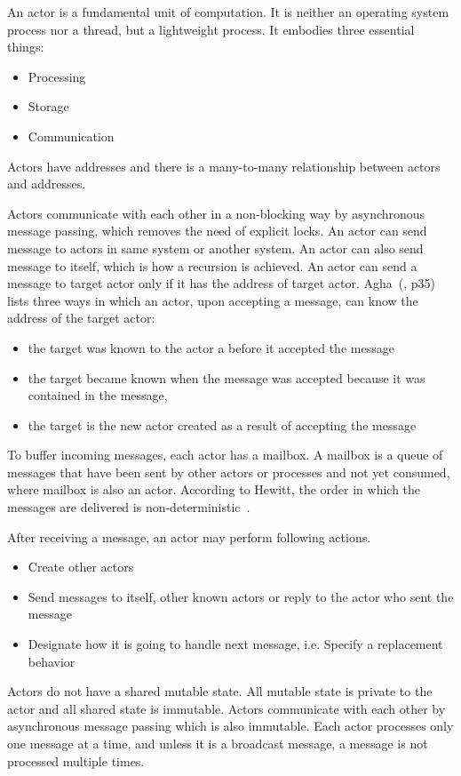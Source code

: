   An actor is a fundamental unit of computation. It is neither an operating system process nor a thread, but a lightweight process. It embodies three essential things:
\begin{itemize}
  \item Processing
  \item Storage
  \item Communication
\end{itemize}
  Actors have addresses and there is a many-to-many relationship between actors and addresses.

  Actors communicate with each other in a non-blocking way by asynchronous message passing, which removes the need of explicit locks. An actor can send message to actors in same system or another system. An actor can also send message to itself, which is how a recursion is achieved. An actor can send a message to target actor only if it has the address of target actor. Agha~(\cite{agha}, p35) lists three ways in which an actor, upon accepting a message, can know the address of the target actor:
  \begin{itemize}
    \item the target was known to the actor a before it accepted the message
    \item the target became known when the message was accepted because it was contained in the message,
    \item the target is the new actor created as a result of accepting the message
  \end{itemize}

  To buffer incoming messages, each actor has a mailbox. A mailbox is a queue of messages that have been sent by other actors or processes and not yet consumed, where mailbox is also an actor. According to Hewitt, the order in which the messages are delivered is non-deterministic~\cite{hewittVideo}.

After receiving a message, an actor may perform following actions.~\cite{hewitt}
\begin{itemize}
  \item Create other actors
  \item Send messages to itself, other known actors or reply to the actor who sent the message
  \item Designate how it is going to handle next message, i.e. Specify a replacement behavior
\end{itemize}

  Actors do not have a shared mutable state. All mutable state is private to the actor and all shared state is immutable. Actors communicate with each other by asynchronous message passing which is also immutable. Each actor processes only one message at a time, and unless it is a broadcast message, a message is not processed multiple times.

